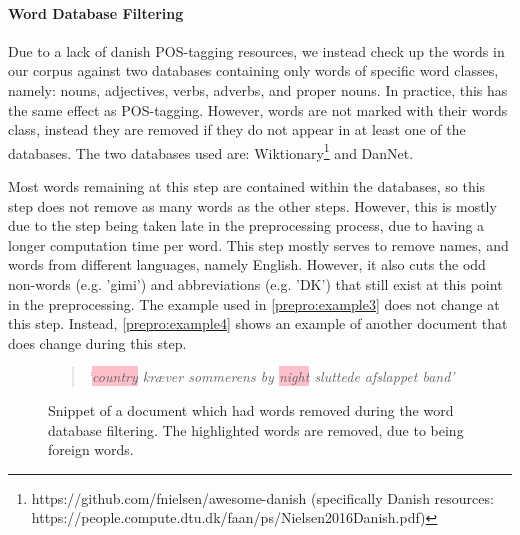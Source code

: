 \paragraph{Word Database Filtering}
Due to a lack of danish POS-tagging resources, we instead check up the words in our corpus against two databases containing only words of specific word classes, namely: nouns, adjectives, verbs, adverbs, and proper nouns.
In practice, this has the same effect as POS-tagging.
However, words are not marked with their words class, instead they are removed if they do not appear in at least one of the databases.
The two databases used are:  Wiktionary\footnote{https://github.com/fnielsen/awesome-danish (specifically Danish resources: https://people.compute.dtu.dk/faan/ps/Nielsen2016Danish.pdf)} and DanNet\cite{Pedersen2009DanNetTC}. 

Most words remaining at this step are contained within the databases, so this step does not remove as many words as the other steps.
However, this is mostly due to the step being taken late in the preprocessing process, due to having a longer computation time per word.
This step mostly serves to remove names, and words from different languages, namely English.
However, it also cuts the odd non-words (e.g. 'gimi') and abbreviations (e.g. 'DK') that still exist at this point in the preprocessing.
The example used in \autoref{prepro:example3} does not change at this step. 
Instead, \autoref{prepro:example4} shows an example of another document that does change during this step.

\begin{figure}[h]
	\begin{framed}
		\begin{quote}
			\textit{
				'\colorbox{pink}{country} kræver sommerens by \colorbox{pink}{night} sluttede afslappet band'
			}
		\end{quote}
	\end{framed}
	\caption{Snippet of a document which had words removed during the word database filtering. The highlighted words are removed, due to being foreign words.}
	\label{prepro:example4}
\end{figure}

